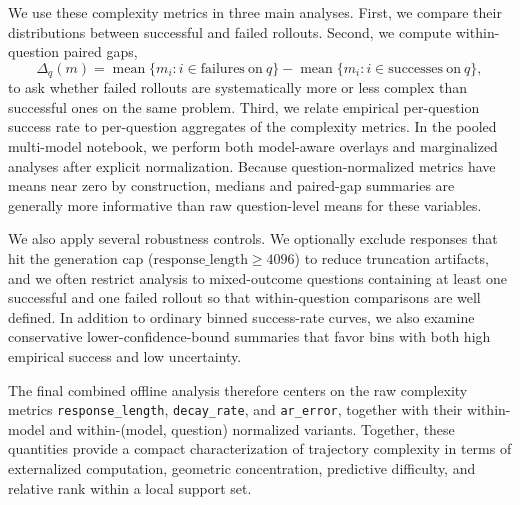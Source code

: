 We use these complexity metrics in three main analyses. First, we compare their distributions between successful and failed rollouts. Second, we compute within-question paired gaps,
\[
\Delta_q(m)
=
\operatorname{mean}\{m_i : i \in \mathrm{failures\ on\ } q\}
-
\operatorname{mean}\{m_i : i \in \mathrm{successes\ on\ } q\},
\]
to ask whether failed rollouts are systematically more or less complex than successful ones on the same problem. Third, we relate empirical per-question success rate to per-question aggregates of the complexity metrics. In the pooled multi-model notebook, we perform both model-aware overlays and marginalized analyses after explicit normalization. Because question-normalized metrics have means near zero by construction, medians and paired-gap summaries are generally more informative than raw question-level means for these variables.

We also apply several robustness controls. We optionally exclude responses that hit the generation cap (\(\mathrm{response\_length} \ge 4096\)) to reduce truncation artifacts, and we often restrict analysis to mixed-outcome questions containing at least one successful and one failed rollout so that within-question comparisons are well defined. In addition to ordinary binned success-rate curves, we also examine conservative lower-confidence-bound summaries that favor bins with both high empirical success and low uncertainty.

The final combined offline analysis therefore centers on the raw complexity metrics \texttt{response\_length}, \texttt{decay\_rate}, and \texttt{ar\_error}, together with their within-model and within-(model, question) normalized variants. Together, these quantities provide a compact characterization of trajectory complexity in terms of externalized computation, geometric concentration, predictive difficulty, and relative rank within a local support set.
